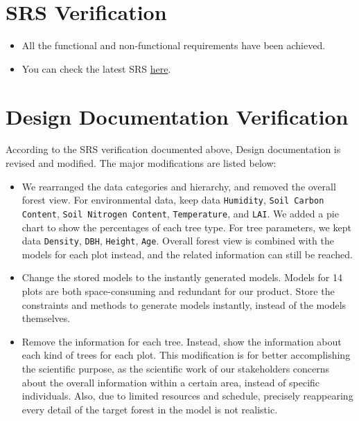 \documentclass[12pt, titlepage]{article}
\begin{document}
\newpage

\tableofcontents

\listoftables %

\listoffigures %

\newpage

\section{SRS Verification}
\begin{itemize}
\item All the functional and non-functional requirements  have
been achieved.
\item You can check the latest SRS \href{https://github.com/wuj187/DigitalTwinCAS/blob/main/docs/SRS/SRS.pdf}{here}.
\end{itemize}


\section{Design Documentation Verification}
According to the SRS verification documented above, Design documentation is
revised and modified. The major modifications are listed below:

\begin{itemize}
\item We rearranged the data categories and hierarchy, and removed the overall
forest view. For environmental data, keep data \verb|Humidity|, 
\verb|Soil Carbon Content|, \verb|Soil Nitrogen Content|, \verb|Temperature|,
and \verb|LAI|. We added a pie chart to show the percentages of each tree 
type. For tree parameters, we kept data \verb|Density|, \verb|DBH|,
\verb|Height|, \verb|Age|. 
Overall forest view is combined with the models for each plot instead, and the
related information can still be reached.

\item Change the stored models to the instantly generated models. Models for 
14 plots are both space-consuming and redundant for our product. Store the
constraints and methods to generate models instantly, instead of the models
themselves.


\item Remove the information for each tree. Instead, show the information
about each kind of trees for each plot. This modification is for better
accomplishing the scientific purpose, as the scientific work of our
stakeholders concerns about the overall information within a certain area,
instead of specific individuals. Also, due to limited resources and schedule,
precisely reappearing every detail of the target forest in the model is not 
realistic. 

\end{itemize}
\end{document}
